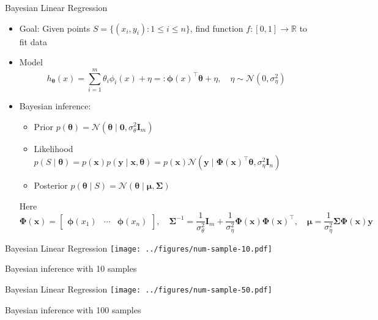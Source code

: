 \documentclass[aspectratio=169]{beamer}
\newcommand{\RR}{\mathbb{R}}
\begin{document}
\begin{frame}{Bayesian Linear Regression}
  \begin{itemize}
    \item
      Goal: Given points $S = \{(x_i, y_i) : 1 \leq i \leq n\}$, find function
      $f : [0, 1] \to \RR$ to fit data
    \item
      Model
      \begin{equation*}
        h_{\bm{\theta}}(x) = \sum_{i = 1}^m \theta_i \phi_i(x) + \eta =:
        \bm{\phi}(x)^\top \bm{\theta} + \eta, \quad \eta \sim \mathcal{N}(0,
        \sigma_\eta^2)
      \end{equation*}
    \item
      Bayesian inference:
      \begin{itemize}
        \item
          Prior $p(\bm{\theta}) = \mathcal{N}(\bm{\theta} \mid \bm{0},
          \sigma_\theta^2
          \mathbf{I}_m)$
        \item
          Likelihood $p(S \mid \bm{\theta}) = p(\bm{x}) p(\bm{y} \mid \bm{x},
          \bm{\theta}) = p(\bm{x}) \mathcal{N}(\bm{y} \mid
          \mathbf{\Phi}(\bm{x})^\top \bm{\theta}, \sigma_\eta^2 \mathbf{I}_n)$
        \item
          Posterior $p(\bm{\theta} \mid S) = \mathcal{N}(\bm{\theta} \mid
          \bm{\mu}, \mathbf{\Sigma})$
      \end{itemize}
      Here
      \begin{equation*}
        \mathbf{\Phi}(\bm{x}) =
        \begin{bmatrix}
          \bm{\phi}(x_1) & \cdots & \bm{\phi}(x_n)
        \end{bmatrix},
        \quad \mathbf{\Sigma}^{-1} = \frac{1}{\sigma_\theta^2} \mathbf{I}_m +
        \frac{1}{\sigma_\eta^2} \mathbf{\Phi}(\bm{x})
        \mathbf{\Phi}(\bm{x})^\top,
        \quad \bm{\mu} = \frac{1}{\sigma_\eta^2} \mathbf{\Sigma}
        \mathbf{\Phi}(\bm{x}) \bm{y}
      \end{equation*}
  \end{itemize}
\end{frame}

\begin{frame}{Bayesian Linear Regression}
  \centering
  \texttt{[image: ../figures/num-sample-10.pdf]}

  Bayesian inference with 10 samples
\end{frame}

\begin{frame}{Bayesian Linear Regression}
  \centering
  \texttt{[image: ../figures/num-sample-50.pdf]}

  Bayesian inference with 100 samples
\end{frame}
\end{document}
